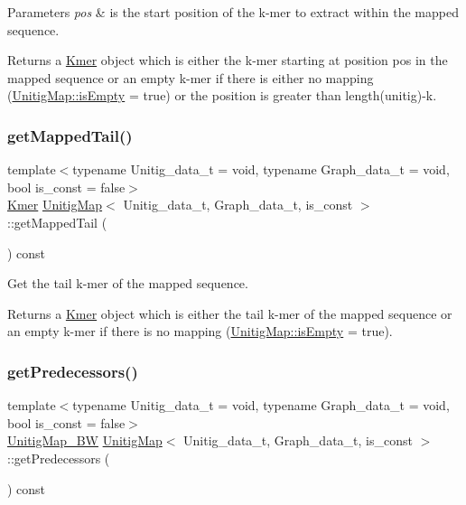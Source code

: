 \begin{DoxyParams}{Parameters}
{\em pos} & is the start position of the k-\/mer to extract within the mapped sequence. \\
\hline
\end{DoxyParams}
\begin{DoxyReturn}{Returns}
a \hyperlink{classKmer}{Kmer} object which is either the k-\/mer starting at position pos in the mapped sequence or an empty k-\/mer if there is either no mapping (\hyperlink{structUnitigMapBase_ade629940b2611494dbf233cb1144da80}{Unitig\+Map\+::is\+Empty} = true) or the position is greater than length(unitig)-\/k. 
\end{DoxyReturn}
\mbox{\label{classUnitigMap_ab06f79aa91086a8d73ea8200f5cc64d4}} 
\subsubsection{\texorpdfstring{get\+Mapped\+Tail()}{getMappedTail()}}
{\footnotesize\ttfamily template$<$typename Unitig\+\_\+data\+\_\+t = void, typename Graph\+\_\+data\+\_\+t = void, bool is\+\_\+const = false$>$ \\
\hyperlink{classKmer}{Kmer} \hyperlink{classUnitigMap}{Unitig\+Map}$<$ Unitig\+\_\+data\+\_\+t, Graph\+\_\+data\+\_\+t, is\+\_\+const $>$\+::get\+Mapped\+Tail (\begin{DoxyParamCaption}{ }\end{DoxyParamCaption}) const}



Get the tail k-\/mer of the mapped sequence. 

\begin{DoxyReturn}{Returns}
a \hyperlink{classKmer}{Kmer} object which is either the tail k-\/mer of the mapped sequence or an empty k-\/mer if there is no mapping (\hyperlink{structUnitigMapBase_ade629940b2611494dbf233cb1144da80}{Unitig\+Map\+::is\+Empty} = true). 
\end{DoxyReturn}
\mbox{\label{classUnitigMap_adfae0ba9c3675fd5612a4b71b46a25c6}} 
\subsubsection{\texorpdfstring{get\+Predecessors()}{getPredecessors()}}
{\footnotesize\ttfamily template$<$typename Unitig\+\_\+data\+\_\+t = void, typename Graph\+\_\+data\+\_\+t = void, bool is\+\_\+const = false$>$ \\
\hyperlink{classBackwardCDBG}{Unitig\+Map\+\_\+\+BW} \hyperlink{classUnitigMap}{Unitig\+Map}$<$ Unitig\+\_\+data\+\_\+t, Graph\+\_\+data\+\_\+t, is\+\_\+const $>$\+::get\+Predecessors (\begin{DoxyParamCaption}{ }\end{DoxyParamCaption}) const}



